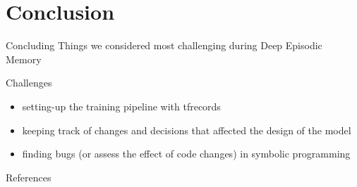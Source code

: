 \documentclass[18pt]{beamer}
\begin{document}
\section{Conclusion}
\begin{frame}{Concluding}
Things we considered most challenging during Deep Episodic Memory
\begin{block}{Challenges}
\begin{itemize}
\item setting-up the training pipeline with tfrecords
\pause
\item keeping track of changes and decisions that affected the design of the model
\pause
\item finding bugs (or assess the effect of code changes) in symbolic programming
\end{itemize}
\end{block}
\end{frame}




\appendix
\beginbackup

\begin{frame}[t,allowframebreaks]{References}
\printbibliography
\end{frame}

\backupend
\end{document}
